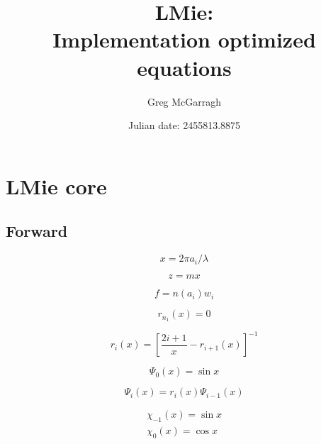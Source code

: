 \documentclass[letterpaper, 11pt]{article}
\title{LMie: \\ Implementation optimized equations}
\author{Greg McGarragh}
\date{Julian date: 2455813.8875}
\begin{document}
\maketitle


\tableofcontents
\newpage


%
\section{LMie core}
\label{sec:lmie_core}

\subsection{Forward}
\label{sec:lmie_core_forward}

\begin{equation}
x = 2 \pi a_{i} / \lambda
\label{eq:lmie_core_x}
\end{equation}

\begin{equation}
z = m x
\label{eq:lmie_core_z}
\end{equation}

\begin{equation}
f = n(a_{i}) w_{i}
\label{eq:lmie_core_f}
\end{equation}

\begin{equation}
r_{n_{1}}(x) = 0
\label{eq:lmie_core_r_n1}
\end{equation}

\begin{equation}
r_{i}(x) = \left[\frac{2i + 1}{x} - r_{i + 1}(x)\right]^{-1}
\label{eq:lmie_core_r_i}
\end{equation}

\begin{equation}
\Psi_{0}(x) = \sin x
\label{eq:lmie_core_psi_0}
\end{equation}

\begin{equation}
\Psi_{i}(x) = r_{i}(x) \Psi_{i-1}(x)
\label{eq:lmie_core_psi_i}
\end{equation}

\begin{gather}
\chi_{-1}(x) = \sin x \\
\chi_{0}(x) = \cos x
\label{eq:lmie_core_chi_m_1_and_chi_1}
\end{gather}
\end{document}
